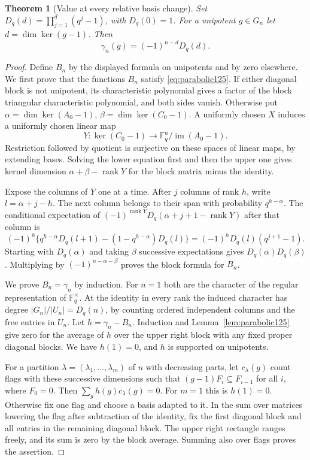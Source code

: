 \documentclass[a4paper,11pt]{article}
\newtheorem{theorem}[proposition]{Theorem}
\theoremstyle{definition}
\theoremstyle{remark}
\numberwithin{equation}{section}
\begin{document}
\begin{theorem}[Value at every relative basis change]\leavevmode\label{thm:char125}
Set \(D_q(d)=\prod_{j=1}^{d}(q^j-1)\), with \(D_q(0)=1\).
For a unipotent \(g\in G_n\) let \(d=\dim\ker(g-1)\). Then
\[
                       \gamma_n(g)=(-1)^{n-d}D_q(d).
\]
\end{theorem}
\begin{proof}
Define \(B_n\) by the displayed formula on unipotents and by zero
elsewhere. We first prove that the functions \(B_n\) satisfy
\eqref{eq:parabolic125}. If either diagonal block is not unipotent,
its characteristic polynomial gives a factor of the block triangular
characteristic polynomial, and both sides vanish. Otherwise put
\(\alpha=\dim\ker(A_0-1)\), \(\beta=\dim\ker(C_0-1)\). A uniformly
chosen \(X\) induces a uniformly chosen linear map
\[
 Y:\ker(C_0-1)\longrightarrow \mathbb F_q^a/\operatorname{im}(A_0-1).
\]
Restriction followed by quotient is surjective on these spaces of
linear maps, by extending bases. Solving the lower equation first
and then the upper one gives kernel dimension
\(\alpha+\beta-\operatorname{rank}Y\) for the block matrix minus
the identity.

Expose the columns of \(Y\) one at a time. After \(j\) columns of
rank \(h\), write \(l=\alpha+j-h\). The next column belongs to
their span with probability \(q^{h-\alpha}\). The conditional
expectation of \((-1)^{\operatorname{rank}Y}D_q(\alpha+j+1-
\operatorname{rank}Y)\) after that column is
\[
 (-1)^h\{q^{h-\alpha}D_q(l+1)-(1-q^{h-\alpha})D_q(l)\}
        =(-1)^h D_q(l)(q^{j+1}-1).
\]
Starting with \(D_q(\alpha)\) and taking \(\beta\) successive
expectations gives \(D_q(\alpha)D_q(\beta)\). Multiplying by
\((-1)^{n-\alpha-\beta}\) proves the block formula for \(B_n\).

We prove \(B_n=\gamma_n\) by induction. For \(n=1\) both are the
character of the regular representation of \(\mathbb F_q^\times\).
At the identity in every rank the induced character has degree
\(|G_n|/|U_n|=D_q(n)\), by counting ordered independent columns
and the free entries in \(U_n\). Let \(h=\gamma_n-B_n\). Induction
and Lemma~\ref{lem:parabolic125} give zero for the average of \(h\)
over the upper right block with any fixed proper diagonal blocks.
We have \(h(1)=0\), and \(h\) is supported on unipotents.

For a partition \(\lambda=(\lambda_1,\ldots,\lambda_m)\) of \(n\)
with decreasing parts, let \(c_\lambda(g)\) count flags with these
successive dimensions such that \((g-1)F_i\subseteq F_{i-1}\) for
all \(i\), where \(F_0=0\). Then \(\sum_g h(g)c_\lambda(g)=0\).
For \(m=1\) this is \(h(1)=0\). Otherwise fix one flag and choose
a basis adapted to it. In the sum over matrices lowering the flag
after subtraction of the identity, fix the first diagonal block
and all entries in the remaining diagonal block. The upper right
rectangle ranges freely, and its sum is zero by the block average.
Summing also over flags proves the assertion.


\end{proof}
\end{document}

